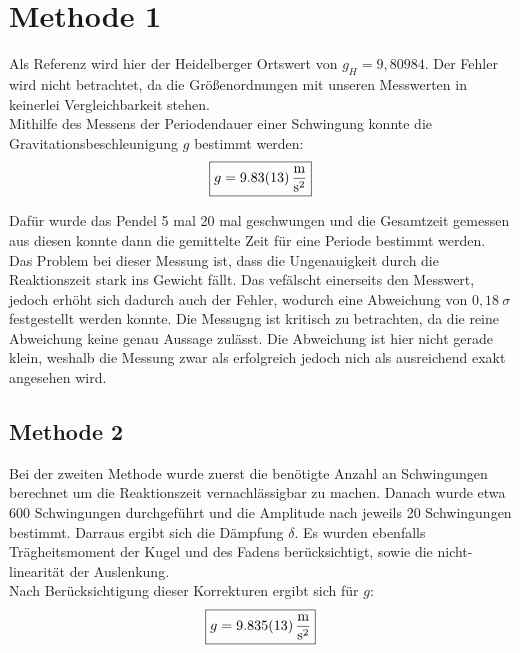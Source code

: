 \section{Methode 1}
Als Referenz wird hier der Heidelberger Ortswert von $g_H = 9,80984$. Der Fehler wird nicht betrachtet, da die Größenordnungen mit unseren Messwerten
in keinerlei Vergleichbarkeit stehen. \\
Mithilfe des Messens der Periodendauer einer Schwingung konnte die Gravitationsbeschleunigung $g$ bestimmt werden:
\[\boxed{g =\SI{9,83 \pm 0,13 }{\frac{\meter}{\second^2}}}\]

Dafür wurde das Pendel 5 mal 20 mal geschwungen und die Gesamtzeit gemessen aus diesen konnte dann die gemittelte Zeit
für eine Periode bestimmt werden.\\
Das Problem bei dieser Messung ist, dass die Ungenauigkeit durch die Reaktionszeit stark ins Gewicht fällt.
Das vefälscht einerseits den Messwert, jedoch erhöht sich dadurch auch der Fehler, wodurch eine Abweichung von $0,18\ \sigma$
festgestellt werden konnte. Die Messugng ist kritisch zu betrachten, da die reine Abweichung keine genau Aussage zulässt.
Die Abweichung ist hier nicht gerade klein, weshalb die Messung zwar als erfolgreich jedoch nich als ausreichend exakt angesehen wird.

\subsection{Methode 2}
Bei der zweiten Methode wurde zuerst die benötigte Anzahl an Schwingungen berechnet um die Reaktionszeit vernachlässigbar zu machen.
Danach wurde etwa 600 Schwingungen durchgeführt und die Amplitude nach jeweils 20 Schwingungen bestimmt. Darraus ergibt sich die
Dämpfung $\delta$. Es wurden ebenfalls Trägheitsmoment der Kugel und des Fadens berücksichtigt, sowie die nicht-linearität der Auslenkung.\\
Nach Berücksichtigung dieser Korrekturen ergibt sich für $g$:
\[\boxed{g = \SI{9,835 \pm 0,013}{\frac{\meter}{\second^2}}}\]

